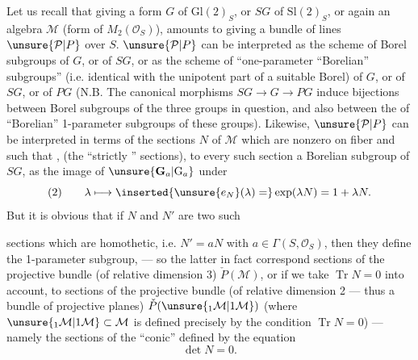 Let us recall that giving  a form $G$ of $\mathrm{Gl}(2)_S$, or $SG$ of $\mathrm{Sl}(2)_S$,  or again an  algebra $\mathcal M$ (form of $M_2(\mathcal O_S)$), amounts to giving a bundle of  lines $\unsure{\mathcal P|P}$ over $S$.
$\unsure{\mathcal P|P}$ can be interpreted as the scheme of Borel subgroups  of $G$, or  of $SG$,  or as the scheme of ``one-parameter  ``Borelian'' subgroups'' (i.e. identical with the unipotent part of a suitable Borel)  of $G$, or of $SG$, or of $PG$ (N.B. The canonical morphisms $SG\longrightarrow G\longrightarrow PG$ induce bijections between  Borel subgroups of the three groups in question, and also between the  of ``Borelian'' 1-parameter subgroups of these groups).
Likewise, $\unsure{\mathcal P|P}$ can be interpreted in terms of the sections $N$  of $\mathcal M$ which are nonzero on  fiber and such that ,
\inserted{\[
(1)\qquad\det N=0,\quad\operatorname{Tr}N=0\qquad\text{hence }N^2=0
\]}
(the ``strictly ''  sections), to every such section  a  Borelian subgroup of $SG$, as the image of $\unsure{\mathbf G_a|\mathrm G_a}$ under
\[
(2)\qquad\lambda\longmapsto\inserted{\unsure{e_N}(\lambda)=}\exp(\lambda N)=1+\lambda N.
\]
But it is obvious that if $N$ and $N'$ are two such



sections which are homothetic, i.e. $N'=aN$ with $a\in\Gamma(S,\mathcal O_S)$,  then they define the  1-parameter subgroup, --- so the latter in fact correspond  sections of the projective bundle (of relative dimension 3) $\check P(\mathcal M)$, or if we take $\operatorname{Tr}N=0$ into account,  to sections of the projective bundle (of relative dimension 2 --- thus a bundle of projective planes) $\check P(\unsure{{}_1\mathcal M|1\mathcal M})$ (where $\unsure{{}_1\mathcal M|1\mathcal M}\subset\mathcal M$ is defined precisely by the condition $\operatorname{Tr}N=0$) --- namely the sections of the  ``conic'' defined by the equation
\[
\det N=0.
\]

